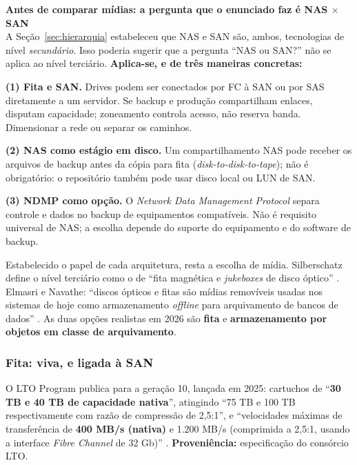 \documentclass[11pt,a4paper]{article}
\newcommand{\destaque}[2]{%
  \begin{center}\begin{minipage}{0.96\textwidth}
  \colorbox{fundo}{\begin{minipage}{\dimexpr\linewidth-2\fboxsep}
  \vspace{2pt}\textbf{\color{azul}\small #1}\\[1pt]\footnotesize #2\vspace{3pt}
  \end{minipage}}\end{minipage}\end{center}}
\begin{document}
\destaque{Antes de comparar mídias: a pergunta que o enunciado faz é NAS $\times$ SAN}{%
A Seção~\ref{sec:hierarquia} estabeleceu que NAS e SAN são, ambos, tecnologias de nível
\emph{secundário}. Isso poderia sugerir que a pergunta ``NAS ou SAN?'' não se aplica ao nível
terciário. \textbf{Aplica-se, e de três maneiras concretas:}

\smallskip
\textbf{(1) Fita e SAN.} Drives podem ser conectados por FC à SAN ou por SAS
diretamente a um servidor. Se backup e produção compartilham enlaces, disputam capacidade;
zoneamento controla acesso, não reserva banda. Dimensionar a rede ou separar os caminhos.

\smallskip
\textbf{(2) NAS como estágio em disco.} Um compartilhamento NAS pode receber os arquivos
de backup antes da cópia para fita (\textit{disk-to-disk-to-tape}); não é obrigatório:
o repositório também pode usar disco local ou LUN de SAN.

\smallskip
\textbf{(3) NDMP como opção.} O \textit{Network Data Management Protocol} separa controle
e dados no backup de equipamentos compatíveis. Não é requisito universal de NAS;
a escolha depende do suporte do equipamento e do software de backup.}

\smallskip
Estabelecido o papel de cada arquitetura, resta a escolha de mídia. Silberschatz define o nível
terciário como o de ``fita magnética e \textit{jukeboxes} de disco óptico'' \cite{silberschatz2020}. Elmasri e Navathe: ``discos ópticos e fitas são mídias removíveis
usadas nos sistemas de hoje como armazenamento \textit{offline} para arquivamento de bancos de
dados'' \cite{elmasri2018}. As duas opções realistas em 2026 são \textbf{fita} e
\textbf{armazenamento por objetos em classe de arquivamento}.

\subsubsection*{Fita: viva, e ligada à SAN}

O LTO Program publica para a geração 10, lançada em 2025: cartuchos de ``\textbf{30 TB e 40 TB de
capacidade nativa}'', atingindo ``75 TB e 100 TB respectivamente com razão de compressão de
2,5:1'', e ``velocidades máximas de transferência de \textbf{400 MB/s (nativa)} e 1.200 MB/s
(comprimida a 2,5:1, usando a interface \textit{Fibre Channel} de 32 Gb)'' \cite{lto10}.
\textbf{Proveniência:} especificação do consórcio LTO.
\end{document}
